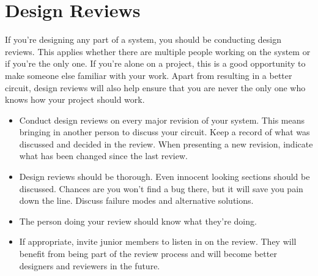 \documentclass{article}
\begin{document}
\section{Design Reviews}
If you're designing any part of a system, you should be conducting design reviews. This applies whether there are multiple people working on the system or if you're the only one. If you're alone on a project, this is a good opportunity to make someone else familiar with your work. Apart from resulting in a better circuit, design reviews will also help ensure that you are never the only one who knows how your project should work.
\begin{itemize}
\item  Conduct design reviews on every major revision of your system. This means bringing in another person to discuss your circuit. Keep a record of what was discussed and decided in the review. When presenting a new revision, indicate what has been changed since the last review.
\item Design reviews should be thorough. Even innocent looking sections should be discussed. Chances are you won't find a bug there, but it will save you pain down the line. Discuss failure modes and alternative solutions.
\item The person doing your review should know what they're doing.
\item If appropriate, invite junior members to listen in on the review. They will benefit from being part of the review process and will become better designers and reviewers in the future.
\end{itemize}
\end{document}
